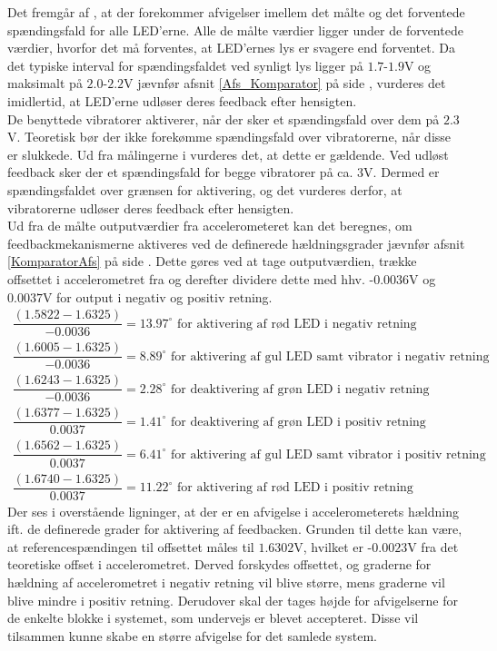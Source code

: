 Det fremgår af , at der forekommer afvigelser imellem det målte og det forventede spændingsfald for alle LED'erne. Alle de målte værdier ligger under de forventede værdier, hvorfor det må forventes, at LED'ernes lys er svagere end forventet. Da det typiske interval for spændingsfaldet ved synligt lys ligger på $1.7$-$1.9$V og maksimalt på $2.0$-$2.2$V jævnfør afsnit \ref{Afs_Komparator} på side \pageref{Afs_Komparator}, vurderes det imidlertid, at LED'erne udløser deres feedback efter hensigten.\\
De benyttede vibratorer aktiverer, når der sker et spændingsfald over dem på $2.3$V. \cite{Machinery2009} Teoretisk bør der ikke forekømme spændingsfald over vibratorerne, når disse er slukkede. Ud fra målingerne i  vurderes det, at dette er gældende. Ved udløst feedback sker der et spændingsfald for begge vibratorer på ca. $3$V. Dermed er spændingsfaldet over grænsen for aktivering, og det vurderes derfor, at vibratorerne udløser deres feedback efter hensigten. \\
Ud fra de målte outputværdier fra accelerometeret kan det beregnes, om feedbackmekanismerne aktiveres ved de definerede hældningsgrader jævnfør afsnit \ref{KomparatorAfs} på side \pageref{KomparatorAfs}. Dette gøres ved at tage outputværdien, trække offsettet i accelerometret fra og derefter dividere dette med hhv. -$0.0036$V og $0.0037$V for output i negativ og positiv retning.
\begin{align}\label{eq:graderLED_1}
\dfrac{(1.5822 - 1.6325)}{-0.0036} = 13.97^{\circ}\text{ for aktivering af rød LED i negativ retning} \\
\dfrac{(1.6005 - 1.6325)}{-0.0036} = 8.89^{\circ}\text{ for aktivering af gul LED samt vibrator i negativ retning} \\
\dfrac{(1.6243 - 1.6325)}{-0.0036} = 2.28^{\circ}\text{ for deaktivering af grøn LED i negativ retning} \\
\dfrac{(1.6377 - 1.6325)}{0.0037} = 1.41^{\circ}\text{ for deaktivering af grøn LED i positiv retning} \\
\dfrac{(1.6562 - 1.6325)}{0.0037} = 6.41^{\circ}\text{ for aktivering af gul LED samt vibrator i positiv retning} \\ \label{eq:graderLED_2}
\dfrac{(1.6740 - 1.6325)}{0.0037} = 11.22^{\circ}\text{ for aktivering af rød LED i positiv retning}
\end{align}
\noindent Der ses i overstående ligninger, at der er en afvigelse i accelerometerets hældning ift. de definerede grader for aktivering af feedbacken. Grunden til dette kan være, at referencespændingen til offsettet måles til $1.6302$V, hvilket er -$0.0023$V fra det teoretiske offset i accelerometret. Derved forskydes offsettet, og graderne for hældning af accelerometret i negativ retning vil blive større, mens graderne vil blive mindre i positiv retning. Derudover skal der tages højde for afvigelserne for de enkelte blokke i systemet, som undervejs er blevet accepteret. Disse vil tilsammen kunne skabe en større afvigelse for det samlede system. \\
